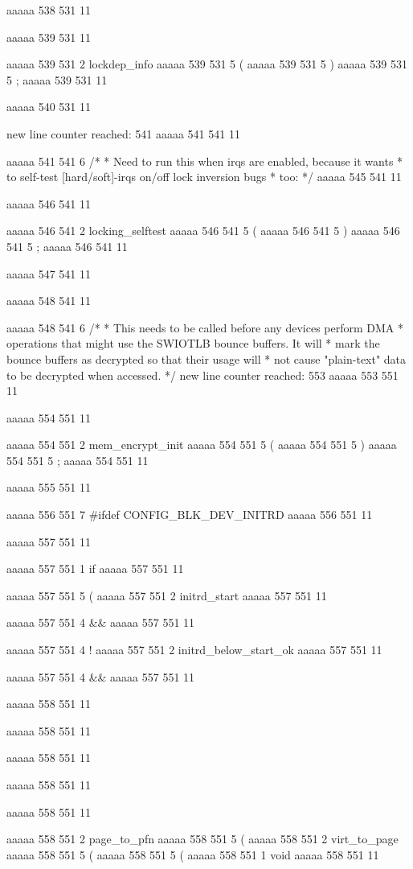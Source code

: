 {aaaaa 538 531
11


aaaaa 539 531
11
	
aaaaa 539 531
2
lockdep_info
aaaaa 539 531
5
(
aaaaa 539 531
5
)
aaaaa 539 531
5
;
aaaaa 539 531
11


aaaaa 540 531
11


new line counter reached: 541
aaaaa 541 541
11
	
aaaaa 541 541
6
/*
	 * Need to run this when irqs are enabled, because it wants
	 * to self-test [hard/soft]-irqs on/off lock inversion bugs
	 * too:
	 */
aaaaa 545 541
11


aaaaa 546 541
11
	
aaaaa 546 541
2
locking_selftest
aaaaa 546 541
5
(
aaaaa 546 541
5
)
aaaaa 546 541
5
;
aaaaa 546 541
11


aaaaa 547 541
11


aaaaa 548 541
11
	
aaaaa 548 541
6
/*
	 * This needs to be called before any devices perform DMA
	 * operations that might use the SWIOTLB bounce buffers. It will
	 * mark the bounce buffers as decrypted so that their usage will
	 * not cause "plain-text" data to be decrypted when accessed.
	 */
new line counter reached: 553
aaaaa 553 551
11


aaaaa 554 551
11
	
aaaaa 554 551
2
mem_encrypt_init
aaaaa 554 551
5
(
aaaaa 554 551
5
)
aaaaa 554 551
5
;
aaaaa 554 551
11


aaaaa 555 551
11


aaaaa 556 551
7
#ifdef CONFIG_BLK_DEV_INITRD
aaaaa 556 551
11


aaaaa 557 551
11
	
aaaaa 557 551
1
if
aaaaa 557 551
11
 
aaaaa 557 551
5
(
aaaaa 557 551
2
initrd_start
aaaaa 557 551
11
 
aaaaa 557 551
4
&&
aaaaa 557 551
11
 
aaaaa 557 551
4
!
aaaaa 557 551
2
initrd_below_start_ok
aaaaa 557 551
11
 
aaaaa 557 551
4
&&
aaaaa 557 551
11


aaaaa 558 551
11
	
aaaaa 558 551
11
 
aaaaa 558 551
11
 
aaaaa 558 551
11
 
aaaaa 558 551
11
 
aaaaa 558 551
2
page_to_pfn
aaaaa 558 551
5
(
aaaaa 558 551
2
virt_to_page
aaaaa 558 551
5
(
aaaaa 558 551
5
(
aaaaa 558 551
1
void
aaaaa 558 551
11
 
}
